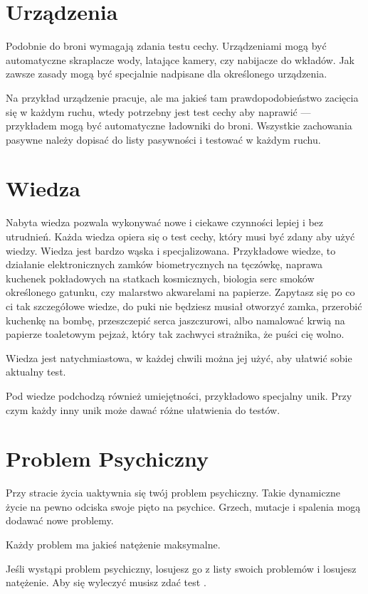 \section{Urządzenia}
Podobnie do broni wymagają zdania testu cechy.
Urządzeniami mogą być automatyczne skraplacze wody, latające kamery, czy nabijacze do wkładów.
Jak zawsze zasady mogą być specjalnie nadpisane dla określonego urządzenia.

Na przykład urządzenie pracuje, ale ma jakieś tam prawdopodobieństwo zacięcia się w każdym ruchu, wtedy potrzebny jest test cechy aby naprawić --- przykładem mogą być automatyczne ładowniki do broni.
Wszystkie zachowania pasywne należy dopisać do listy pasywności i testować w każdym ruchu.

\section{Wiedza}
Nabyta wiedza pozwala wykonywać nowe i ciekawe czynności lepiej i bez utrudnień.
Każda wiedza opiera się o test cechy, który musi być zdany aby użyć wiedzy.
Wiedza jest bardzo wąska i specjalizowana.
Przykładowe wiedze, to działanie elektronicznych zamków biometrycznych na tęczówkę, naprawa kuchenek pokładowych na statkach kosmicznych, biologia serc smoków określonego gatunku, czy malarstwo akwarelami na papierze.
Zapytasz się po co ci tak szczegółowe wiedze, do puki nie będziesz musiał otworzyć zamka, przerobić kuchenkę na bombę, przeszczepić serca jaszczurowi, albo namalować krwią na papierze toaletowym pejzaż, który tak zachwyci strażnika, że puści cię wolno.

Wiedza jest natychmiastowa, w każdej chwili można jej użyć, aby ułatwić sobie aktualny test.

Pod wiedze podchodzą również umiejętności, przykładowo specjalny unik.
Przy czym każdy inny unik może dawać różne ułatwienia do testów.

\section{Problem Psychiczny}
Przy stracie życia uaktywnia się twój problem psychiczny.
Takie dynamiczne życie na pewno odciska swoje pięto na psychice. 
Grzech, mutacje i spalenia mogą dodawać nowe problemy.

Każdy problem ma jakieś natężenie maksymalne.

Jeśli wystąpi problem psychiczny, losujesz go z listy swoich problemów i losujesz natężenie.
Aby się wyleczyć musisz zdać test \abh{}.

